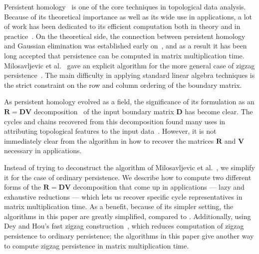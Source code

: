 \documentclass{article}
\newcommand{\mat}[1]{\mathbf{#1}}
\begin{document}
Persistent homology~\cite{edelsbrunner2002topological} is one of the core techniques in topological data analysis. Because of its theoretical importance as well as its wide use in applications, a lot of work has been dedicated to its efficient computation both in theory \cite{milosavljevic2011zigzag,de2011dualities,chen2011output,busaryev2012annotating,kerber2016persistent} and in practice~\cite{bauer2014clear,bauer2017phat,bauer2021ripser,hylton2017performance,henselmanghristl6,wagner2011efficient}.
On the theoretical side, the connection between persistent homology and Gaussian elimination was established early on~\cite{zomorodian2004computing}, and as a result it has been long accepted that persistence can be computed in matrix multiplication time. Milosavljevic et al.~\cite{milosavljevic2011zigzag} gave an explicit algorithm for the more general case of zigzag persistence~\cite{CdS10,CdSM09}. The main difficulty in applying standard linear algebra techniques is the strict constraint on the row and column ordering of the boundary matrix. 

As persistent homology evolved as a field, the significance of its formulation as an $\mat{R} = \mat{D} \mat{V}$ decomposition~\cite{cohen2006vines} of the input boundary matrix $\mat{D}$ has become clear. The cycles and chains recovered from this decomposition found many uses in attributing topological features to the input data~\cite{dSMVJ11,CSLV22,NiMo24}. However, it is not immediately clear from the algorithm in \cite{milosavljevic2011zigzag} how to recover the matrices $\mat{R}$ and $\mat{V}$ necessary in applications.

Instead of trying to deconstruct the algorithm of Milosavljevic et al.~\cite{milosavljevic2011zigzag}, we simplify it for the case of ordinary persistence.
We describe how to compute two different forms of the $\mat{R} = \mat{D}\mat{V}$ decomposition that come up in applications --- lazy and exhaustive reductions --- which lets us recover specific cycle representatives in matrix multiplication time.
As a benefit, because of its simpler setting, the algorithms in this paper are greatly simplified, compared to \cite{milosavljevic2011zigzag}.
%
Additionally, using Dey and Hou's fast zigzag construction~\cite{dey2022fast}, which reduces computation of zigzag persistence to ordinary persistence; the algorithms in this paper give another way to compute zigzag persistence in matrix multiplication time.
\end{document}

